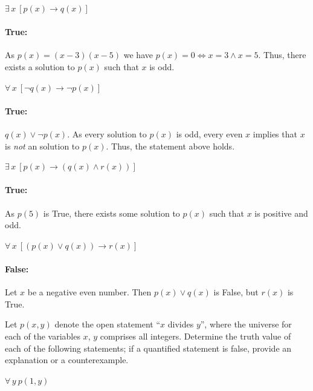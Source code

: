 \documentclass[a4paper, english, 12pt]{article} %
\begin{document}
\begin{subproblem}[5]
  $\exists \, x \ [p(x) \to q(x)]$
\end{subproblem}
%
\begin{answer} 
  \paragraph{True:} As $p(x) = (x-3)(x-5)$ we have $p(x) = 0 \Leftrightarrow x =
  3 \wedge x = 5$. Thus, there exists a solution to $p(x)$ such that $x$ is odd.
\end{answer}

\begin{subproblem}
  $\forall \, x \ [\neg q(x) \to \neg p(x)]$
\end{subproblem}
\begin{answer}
  \paragraph{True:} $q(x) \vee \neg p(x)$. As every solution to $p(x)$ is odd,
  every even $x$ implies that $x$ is \emph{not} an solution to $p(x)$. Thus, the
  statement above holds.
\end{answer}
\begin{subproblem}
  $\exists \, x \ [p(x) \to (q(x) \wedge r(x))]$
\end{subproblem}
\begin{answer}
  \paragraph{True:} As $p(5)$ is True, there exists some solution to $p(x)$ such that $x$ is
  positive and odd.
\end{answer}
\begin{subproblem}
  $\forall \, x \ [(p(x) \vee q(x)) \to r(x)]$
\end{subproblem}
\begin{answer}
  \paragraph{False: } Let $x$ be a negative even number. Then $p(x) \vee q(x)$
  is False, but $r(x)$ is True.
\end{answer}


  
\begin{problem}[12]
  \begin{subproblem}
    Let $p(x,y)$ denote the open statement ``$x$ divides $y$'', where the
    universe for each of the variables $x$, $y$ comprises all integers.
    Determine the truth value of each of the following statements; if a
    quantified statement is false, provide an explanation or a counterexample.
  \end{subproblem}
\end{problem}
% 
\begin{subsubproblem}[3]
  $\forall \, y \ p(1, y)$
\end{subsubproblem}
\end{document}
